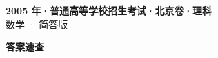 \documentclass[zihao=-4, a4paper]{ctexart}
\begin{document}
\begin{center}
  {\Large\bfseries 2005 年·普通高等学校招生考试·北京卷·理科}\\[4pt]
  {\large 数学 · 简答版}
\end{center}
\medskip
{}

\clearpage
{}
\begin{center}{\Large\bfseries 答案速查}\end{center}
\medskip

\end{document}
